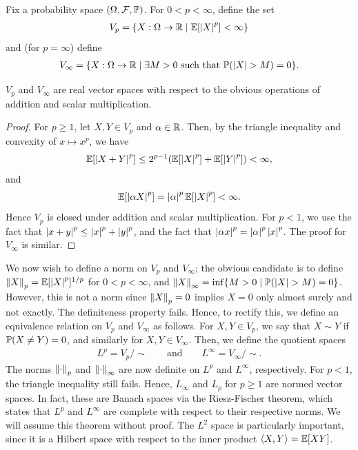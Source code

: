 Fix a probability space $(\Omega,\mathcal{F},\mathbb{P})$. For $0 < p <\infty$, define the set
\begin{align}
    V_{p} = \{X:\Omega \to \mathbb{R} \mid \mathbb{E}[\left| X \right|^{p}] < \infty\}
\end{align}
and (for $p = \infty$) define
\begin{align}
    V_{\infty} = \{X:\Omega \to \mathbb{R} \mid \exists M > 0 \text{ such that } \mathbb{P}(\left| X \right| > M) = 0\}.
\end{align}

\begin{proposition}
    $V_{p}$ and $V_{\infty}$ are real vector spaces with respect to the obvious operations of addition and scalar multiplication.
\end{proposition}
\begin{proof}
    For $p \geq 1$, let $X,Y \in V_{p}$ and $\alpha \in \mathbb{R}$. Then, by the triangle inequality and convexity of $x \mapsto x^{p}$, we have
    \begin{align}
        \mathbb{E}[\left| X+Y \right|^{p}] \leq 2^{p-1}(\mathbb{E}[\left| X \right|^{p}] + \mathbb{E}[\left| Y \right|^{p}]) < \infty,
    \end{align}
    and
    \begin{align}
        \mathbb{E}[\left| \alpha X \right|^{p}] = \left| \alpha \right|^{p}\mathbb{E}[\left| X \right|^{p}] < \infty.
    \end{align}
    Hence $V_{p}$ is closed under addition and scalar multiplication. For $p < 1$, we use the fact that $\left| x+y \right|^{p} \leq \left| x \right|^{p} + \left| y \right|^{p}$, and the fact that $\left| \alpha x \right|^{p} = \left| \alpha \right|^{p}\left| x \right|^{p}$. The proof for $V_{\infty}$ is similar.
\end{proof}

We now wish to define a norm on $V_{p}$ and $V_{\infty}$; the obvious candidate is to define $\left\lVert X\right\rVert_{p} = \mathbb{E}[\left| X \right|^{p}]^{1/p}$ for $0 < p < \infty$, and $\left\lVert X\right\rVert_{\infty} = \inf\{M > 0 \mid \mathbb{P}(\left| X \right| > M) = 0\}$. However, this is not a norm since $\left\lVert X\right\rVert_{p} = 0$ implies $X = 0$ only almost surely and not exactly. The definiteness property fails. Hence, to rectify this, we define an equivalence relation on $V_{p}$ and $V_{\infty}$ as follows. For $X,Y \in V_{p}$, we say that $X \sim Y$ if $\mathbb{P}(X \neq Y) = 0$, and similarly for $X,Y \in V_{\infty}$. Then, we define the quotient spaces
\begin{align}
    L^{p} = V_{p}/\sim \qquad \text{and} \qquad L^{\infty} = V_{\infty}/\sim.
\end{align}
The norms $\left\lVert\cdot\right\rVert_{p}$ and $\left\lVert\cdot\right\rVert_{\infty}$ are now definite on $L^{p}$ and $L^{\infty}$, respectively. For $p < 1$, the triangle inequality still fails. Hence, $L_{\infty}$ and $L_{p}$ for $p \geq 1$ are normed vector spaces. In fact, these are Banach spaces via the Riesz-Fischer theorem, which states that $L^{p}$ and $L^{\infty}$ are complete with respect to their respective norms. We will assume this theorem without proof. The $L^{2}$ space is particularly important, since it is a Hilbert space with respect to the inner product $\langle X,Y\rangle = \mathbb{E}[XY]$.

